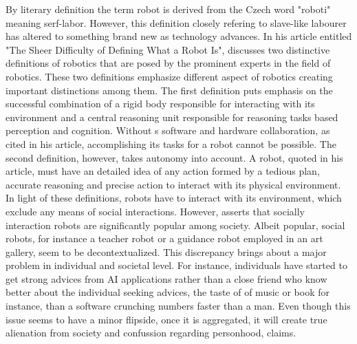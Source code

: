 \documentclass[man]{apa6}
\begin{document}
By literary definition the term robot is derived from the Czech word "roboti" meaning serf-labor. However, this definition closely refering to slave-like labourer has altered to something brand new as technology advances. In his article entitled "The Sheer Difficulty of Defining What a Robot Is",  discusses two distinctive definitions of robotics that are posed by the prominent experts in the field of robotics. These two definitions emphasize different aspect of robotics creating important distinctions among them. The first definition puts emphasis on the successful combination of a rigid body responsible for interacting with its environment and a central reasoning unit responsible for reasoning tasks based perception and cognition. Without s software and hardware collaboration, as  cited in his article, accomplishing its tasks for a robot cannot be possible.
The second definition, however, takes autonomy into account. A robot,  quoted in his article, must have an detailed idea of any action formed by a tedious plan, accurate reasoning and precise action to interact with its physical environment. In light of these definitions, robots have to interact with its environment, which exclude any means of social interactions. However,  asserts that socially interaction robots are significantly popular among society. Albeit popular, social robots, for instance a teacher robot or a guidance robot employed in an art gallery, seem to be decontextualized. This discrepancy brings about a major problem in individual and societal level. For instance, individuals have started to get strong advices from AI applications rather than a close friend who know better about the individual seeking advices, the taste of of music or book for instance, than a software crunching numbers faster than a man. Even though this issue seems to have a minor flipside, once it is aggregated, it will create true alienation from society and confussion regarding personhood,  claims.\par
\end{document}

